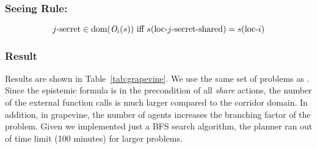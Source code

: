 \subsubsection{Seeing Rule:}
\[
    \text{$j$-secret} \in \textrm{dom}(\mathit{O}_i(s)) \text{ iff } s(\text{loc-$j$-secret-shared})=s(\text{loc-$i$})
\]


\subsubsection{Result}
Results are shown in Table~\ref{tab:grapevine}.
We use the same set of problems as \citet{DBLP:journals/ai/MuiseBFMMPS22}.
Since the epistemic formula is in the precondition of all \emph{share} actions, the number of the external function calls is much larger compared to the corridor domain.
In addition, in grapevine, the number of agents increases the branching factor of the problem. 
Given we implemented just a BFS search algorithm, the planner ran out of time limit (100 minutes) for larger problems.

